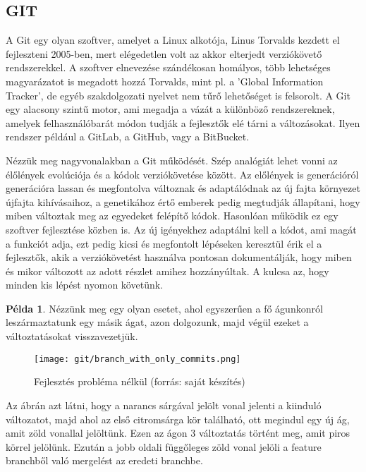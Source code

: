 \documentclass{article}
\theoremstyle{definition}
\theoremstyle{theorem}
\newtheorem{example}{Példa}
\begin{document}
\subsection{GIT}
A Git \cite{git} egy olyan szoftver, amelyet a Linux alkotója, Linus Torvalds kezdett el fejleszteni 2005-ben, mert elégedetlen volt az akkor elterjedt verziókövető rendszerekkel. A szoftver elnevezése szándékosan homályos, több lehetséges magyarázatot is megadott hozzá Torvalds, mint pl. a 'Global Information Tracker', de egyéb szakdolgozati nyelvet nem tűrő lehetőséget is felsorolt. A Git egy alacsony szintű motor, ami megadja a vázát a különböző rendszereknek, amelyek felhasználóbarát módon tudják a fejlesztők elé tárni a változásokat. Ilyen rendszer például a GitLab, a GitHub, vagy a BitBucket.

Nézzük meg nagyvonalakban a Git működését. Szép analógiát lehet vonni az élőlények evolúciója és a kódok verziókövetése között. Az előlények is generációról generációra lassan és megfontolva változnak és adaptálódnak az új fajta környezet újfajta kihívásaihoz, a genetikához értő emberek pedig megtudják állapítani, hogy miben változtak meg az egyedeket felépítő kódok. Hasonlóan működik ez egy szoftver fejlesztése közben is. Az új igényekhez adaptálni kell a kódot, ami magát a funkciót adja, ezt pedig kicsi és megfontolt lépéseken keresztül érik el a fejlesztők, akik a verziókövetést használva pontosan dokumentálják, hogy miben és mikor változott az adott részlet amihez hozzányúltak. A kulcsa az, hogy minden kis lépést nyomon követünk.

\begin{example}
Nézzünk meg egy olyan esetet, ahol egyszerűen a fő águnkonról leszármaztatunk egy másik ágat, azon dolgozunk, majd végül ezeket a változtatásokat visszavezetjük.
\begin{figure}[H]
    \centering
    \texttt{[image: git/branch\_with\_only\_commits.png]}
    \caption{Fejlesztés probléma nélkül (forrás: saját készítés)}
    \label{nincs_konflikt}
\end{figure}

\end{example}

Az ábrán azt látni, hogy a narancs sárgával jelölt vonal jelenti a kiinduló változatot, majd ahol az első citromsárga kör található, ott megindul egy új ág, amit zöld vonallal jelöltünk. Ezen az ágon 3 változtatás történt meg, amit piros körrel jelölünk. Ezután a jobb oldali függőleges zöld vonal jelöli a feature branchből való mergelést az eredeti branchbe.
\end{document}

